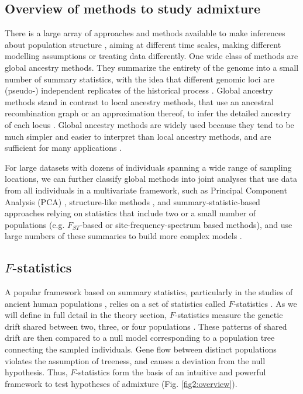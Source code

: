 \documentclass[12pt]{article}
\begin{document}
\subsection{Overview of methods to study admixture}
There is a large array of approaches and methods available to make inferences about population structure \citep{sch raiber_methods_2015}, aiming at different time scales, making different modelling assumptions or treating data differently. 
One wide class of methods are global ancestry methods. They summarize the entirety of the genome into a small number of summary statistics, with the idea that different genomic loci are (pseudo-) independent replicates of the historical process \citep{pritchard_inference_2000, gopalan_scaling_2016, patterson_ancient_2012,alexander_fast_2009, tang_estimation_2005}. Global ancestry methods stand in contrast to local ancestry methods, that use an ancestral recombination graph or an approximation thereof, to infer the detailed ancestry of each locus  \citep{lawson_inference_2012, hellenthal_genetic_2014, speidel_method_2019, kelleher_inferring_2019}. Global ancestry methods are widely used because they tend to be much simpler and easier to interpret than local ancestry methods, and are sufficient for many applications \citep{pritchard_inference_2000, patterson_population_2006}.

For large datasets with dozens of individuals spanning a wide range of sampling locations, we can further classify global methods into joint analyses that use data from all individuals in a multivariate framework, such as Principal Component Analysis (PCA) \citep{cavalli-sforza_analysis_1975, patterson_population_2006, novembre_genes_2008}, structure-like methods \citep{pritchard_inference_2000, alexander_fast_2009}, and summary-statistic-based approaches relying on statistics that include two or a small number of populations (e.g. $F_{ST}$-based or site-frequency-spectrum based methods), and use large numbers of these summaries to build more complex models \citep{excoffier_fastsimcoal_2011, kamm_efficiently_2020, gutenkunst_inferring_2009}. 

\subsection{$F$-statistics}
A popular framework based on summary statistics, particularly in the studies of ancient human populations \citep{orlando_ancient_2021}, relies on a set of statistics called $F$-statistics \citep{patterson_ancient_2012, peter_admixture_2016}. As we will define in full detail in the theory section, $F$-statistics measure the genetic drift shared between two, three, or four populations \citep{patterson_ancient_2012, peter_admixture_2016}. These patterns of shared drift are then compared to a null model corresponding to a population tree connecting the sampled individuals. Gene flow between distinct populations violates the assumption of treeness, and causes a deviation from the null hypothesis. Thus, $F$-statistics form the basis of an intuitive and powerful framework to test hypotheses of admixture (Fig. \ref{fig2:overview}). 
\end{document}
